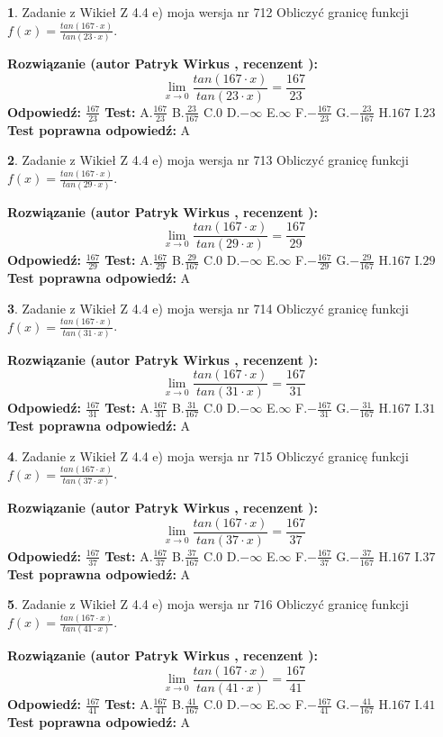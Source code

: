 \documentclass[12pt, a4paper]{article}
\theoremstyle{definition} %
\newtheorem{zad}{}
\newcommand{\zadStart}[1]{\begin{zad}#1\newline}
\newcommand{\zadStop}{\end{zad}}
\newcommand{\rozwStart}[2]{\noindent \textbf{Rozwiązanie (autor #1 , recenzent #2): }\newline}
\newcommand{\rozwStop}{\newline}
\newcommand{\odpStart}{\noindent \textbf{Odpowiedź:}\newline}
\newcommand{\odpStop}{\newline}
\newcommand{\testStart}{\noindent \textbf{Test:}\newline}
\newcommand{\testStop}{\newline}
\newcommand{\kluczStart}{\noindent \textbf{Test poprawna odpowiedź:}\newline}
\newcommand{\kluczStop}{\newline}
\begin{document}
\zadStart{Zadanie z Wikieł Z 4.4 e) moja wersja nr 712}
Obliczyć granicę funkcji $f(x)=\frac{tan(167\cdot x)}{tan(23\cdot x)}$.
\zadStop
\rozwStart{Patryk Wirkus}{}
$$\lim\limits_{x\to 0}\frac{tan(167\cdot x)}{tan(23\cdot x)}=
\frac{167}{23}$$
\rozwStop
\odpStart
$\frac{167}{23}$
\odpStop
\testStart
A.$\frac{167}{23}$
B.$\frac{23}{167}$
C.$0$
D.$-\infty$
E.$\infty$
F.$-\frac{167}{23}$
G.$-\frac{23}{167}$
H.$167$
I.$23$
\testStop
\kluczStart
A
\kluczStop



\zadStart{Zadanie z Wikieł Z 4.4 e) moja wersja nr 713}
Obliczyć granicę funkcji $f(x)=\frac{tan(167\cdot x)}{tan(29\cdot x)}$.
\zadStop
\rozwStart{Patryk Wirkus}{}
$$\lim\limits_{x\to 0}\frac{tan(167\cdot x)}{tan(29\cdot x)}=
\frac{167}{29}$$
\rozwStop
\odpStart
$\frac{167}{29}$
\odpStop
\testStart
A.$\frac{167}{29}$
B.$\frac{29}{167}$
C.$0$
D.$-\infty$
E.$\infty$
F.$-\frac{167}{29}$
G.$-\frac{29}{167}$
H.$167$
I.$29$
\testStop
\kluczStart
A
\kluczStop



\zadStart{Zadanie z Wikieł Z 4.4 e) moja wersja nr 714}
Obliczyć granicę funkcji $f(x)=\frac{tan(167\cdot x)}{tan(31\cdot x)}$.
\zadStop
\rozwStart{Patryk Wirkus}{}
$$\lim\limits_{x\to 0}\frac{tan(167\cdot x)}{tan(31\cdot x)}=
\frac{167}{31}$$
\rozwStop
\odpStart
$\frac{167}{31}$
\odpStop
\testStart
A.$\frac{167}{31}$
B.$\frac{31}{167}$
C.$0$
D.$-\infty$
E.$\infty$
F.$-\frac{167}{31}$
G.$-\frac{31}{167}$
H.$167$
I.$31$
\testStop
\kluczStart
A
\kluczStop



\zadStart{Zadanie z Wikieł Z 4.4 e) moja wersja nr 715}
Obliczyć granicę funkcji $f(x)=\frac{tan(167\cdot x)}{tan(37\cdot x)}$.
\zadStop
\rozwStart{Patryk Wirkus}{}
$$\lim\limits_{x\to 0}\frac{tan(167\cdot x)}{tan(37\cdot x)}=
\frac{167}{37}$$
\rozwStop
\odpStart
$\frac{167}{37}$
\odpStop
\testStart
A.$\frac{167}{37}$
B.$\frac{37}{167}$
C.$0$
D.$-\infty$
E.$\infty$
F.$-\frac{167}{37}$
G.$-\frac{37}{167}$
H.$167$
I.$37$
\testStop
\kluczStart
A
\kluczStop



\zadStart{Zadanie z Wikieł Z 4.4 e) moja wersja nr 716}
Obliczyć granicę funkcji $f(x)=\frac{tan(167\cdot x)}{tan(41\cdot x)}$.
\zadStop
\rozwStart{Patryk Wirkus}{}
$$\lim\limits_{x\to 0}\frac{tan(167\cdot x)}{tan(41\cdot x)}=
\frac{167}{41}$$
\rozwStop
\odpStart
$\frac{167}{41}$
\odpStop
\testStart
A.$\frac{167}{41}$
B.$\frac{41}{167}$
C.$0$
D.$-\infty$
E.$\infty$
F.$-\frac{167}{41}$
G.$-\frac{41}{167}$
H.$167$
I.$41$
\testStop
\kluczStart
A
\kluczStop
\end{document}
